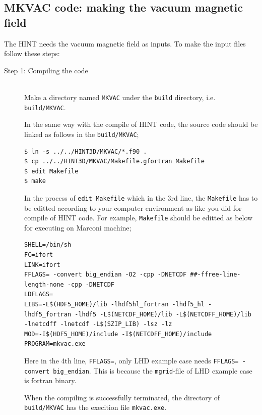 \documentclass[10pt]{ltxdoc} %
\begin{document}
\subsection{MKVAC code: making the vacuum magnetic field}
The HINT needs the vacuum magnetic field as inputs. 
To make the input files follow these steps:
\begin{description}
 \item[Step 1: Compiling the code]\mbox{}\\
Make a directory named \texttt{MKVAC} under the \texttt{build} directory, i.e. \texttt{build/MKVAC}. 

In the same way with the compile of HINT code, the source code should be linked as follows in the \texttt{build/MKVAC};
\vspace{2mm}
\begin{verbatim}
$ ln -s ../../HINT3D/MKVAC/*.f90 .
$ cp ../../HINT3D/MKVAC/Makefile.gfortran Makefile
$ edit Makefile
$ make
\end{verbatim}
\vspace{2mm}

In the process of \texttt{edit Makefile} which in the 3rd line, the \texttt{Makefile} has to be editted according to your computer environment as like you did for compile of HINT code. 
For example, \texttt{Makefile} should be editted as below for executing on Marconi machine;
\vspace{2mm}
\begin{verbatim}
SHELL=/bin/sh
FC=ifort
LINK=ifort
FFLAGS= -convert big_endian -O2 -cpp -DNETCDF ##-ffree-line-length-none -cpp -DNETCDF
LDFLAGS=
LIBS=-L$(HDF5_HOME)/lib -lhdf5hl_fortran -lhdf5_hl -lhdf5_fortran -lhdf5 -L$(NETCDF_HOME)/lib -L$(NETCDFF_HOME)/lib -lnetcdff -lnetcdf -L$(SZIP_LIB) -lsz -lz
MOD=-I$(HDF5_HOME)/include -I$(NETCDFF_HOME)/include
PROGRAM=mkvac.exe
\end{verbatim}
\vspace{2mm}

Here in the 4th line, \texttt{FFLAGS=}, only LHD example case needs \texttt{FFLAGS= -convert big\_endian}. This is because the \texttt{mgrid}-file of LHD example case is fortran binary. 

When the compiling is successfully terminated, the directory of \texttt{build/MKVAC} has the execition file \texttt{mkvac.exe}. 



\end{description}
\end{document}
